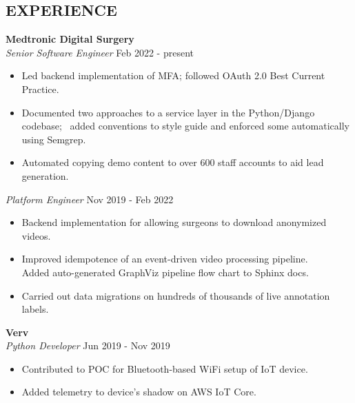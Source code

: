 \documentclass[line,margin]{res}
\begin{document}
\begin{resume}
\section{EXPERIENCE} \textbf{Medtronic Digital Surgery} \\
                {\sl Senior Software Engineer} \hfill   Feb 2022 - present \\
                 \begin{itemize}  \itemsep -2pt %
                   \item Led backend implementation of MFA; followed OAuth 2.0 Best Current Practice. 
                   \item Documented two approaches to a service layer in the Python/Django codebase; \
                         added conventions to style guide and enforced some automatically using Semgrep.
                   \item Automated copying demo content to over 600 staff accounts to aid lead generation. 
                 \end{itemize}
                {\sl Platform Engineer} \hfill          Nov 2019 - Feb 2022 \\
                  \begin{itemize}  \itemsep -2pt %
                  \item Backend implementation for allowing surgeons to download anonymized videos.
                  \item Improved idempotence of an event-driven video processing pipeline. \\
                        Added auto-generated GraphViz pipeline flow chart to Sphinx docs. 
                  \item Carried out data migrations on hundreds of thousands of live annotation labels.
                  \end{itemize} 

                \textbf{Verv} \\
                {\sl Python Developer} \hfill        Jun 2019 - Nov 2019 \\
                  \begin{itemize} \itemsep -2pt %
                  \item Contributed to POC for Bluetooth-based WiFi setup of IoT device.\ 
                  \item Added telemetry to device's shadow on AWS IoT Core. 
                  \end{itemize} 


\end{resume}
\end{document}
